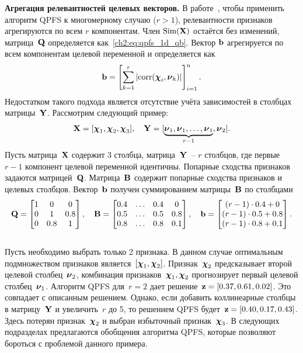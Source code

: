 \textbf{Агрегация релевантностей целевых векторов.}
В работе~\cite{motrenko2018multi}, чтобы применить алгоритм QPFS к многомерному случаю ($r > 1$), релевантности признаков агрегируются по всем $r$ компонентам. Член $\text{Sim}(\mathbf{X})$ остаётся без изменений, матрица~$\mathbf{Q}$ определяется как~\eqref{ch2:eq:qpfs_1d_qb}. Вектор $\mathbf{b}$ агрегируется по всем компонентам целевой переменной и определяется как
\begin{equation*}
\mathbf{b} = \left[\sum_{k=1}^r|\text{corr}(\boldsymbol{\chi}_i, \boldsymbol{\nu}_k)|\right]_{i=1}^n.
\end{equation*}
Недостатком такого подхода является отсутствие учёта зависимостей в столбцах матрицы~$\mathbf{Y}$. Рассмотрим следующий пример:
\begin{equation*}
\mathbf{X} = [\boldsymbol{\chi}_1, \boldsymbol{\chi}_2, \boldsymbol{\chi}_3], \quad \mathbf{Y} = [\underbrace{\boldsymbol{\nu}_1, \boldsymbol{\nu}_1, \dots, \boldsymbol{\nu}_1}_{r-1}, \boldsymbol{\nu}_2].
\end{equation*}
Пусть матрица~$\mathbf{X}$ содержит 3 столбца, матрица~$\mathbf{Y}$~-- $r$ столбцов, где первые $r-1$ компонент целевой переменной идентичны.
Попарные сходства признаков задаются матрицей~$\mathbf{Q}$.
Матрица~$\mathbf{B}$ содержит попарные сходства признаков и целевых столбцов.
Вектор~$\mathbf{b}$ получен суммированием матрицы~$\mathbf{B}$ по столбцами
\begin{equation}
\mathbf{Q} = \begin{bmatrix} 1 & 0 & 0\\ 0 & 1 & 0.8 \\ 0 & 0.8 & 1 \end{bmatrix}, \quad
\mathbf{B} = \begin{bmatrix} 0.4 & \dots & 0.4 & 0 \\ 0.5 & \dots & 0.5 & 0.8 \\ 0.8 & \dots & 0.8 & 0.1 \end{bmatrix}, \quad
\mathbf{b} = \begin{bmatrix} (r-1) \cdot 0.4 + 0 \\ (r-1) \cdot 0.5 + 0.8 \\ (r-1) \cdot 0.8 + 0.1 \end{bmatrix}.
\label{ch2:eq:qpfs_example}
\end{equation}
\vspace{0.5cm} \\
Пусть необходимо выбрать только 2 признака.
В данном случае оптимальным подмножеством признаков является~$[\boldsymbol{\chi}_1, \boldsymbol{\chi}_2]$.
Признак~$\boldsymbol{\chi}_2$ предсказывает второй целевой столбец~$\boldsymbol{\nu}_2$, комбинация признаков~$\boldsymbol{\chi}_1, \boldsymbol{\chi}_2$ прогнозирует первый целевой столбец~$\boldsymbol{\nu}_1$.
Алгоритм QPFS для~$r=2$ дает решение~$\mathbf{z} = [0.37, 0.61, 0.02]$. Это совпадает с описанным решением.
Однако, если добавить коллинеарные столбцы в матрицу~$\mathbf{Y}$ и увеличить~$r$ до 5, то решением QPFS будет~$\mathbf{z} = [0.40, 0.17, 0.43]$.
Здесь потерян признак~$\boldsymbol{\chi}_2$ и выбран избыточный признак~$\boldsymbol{\chi}_3$.
В следующих подразделах предлагаются обобщения алгоритма QPFS, которые позволяют бороться с проблемой данного примера.


